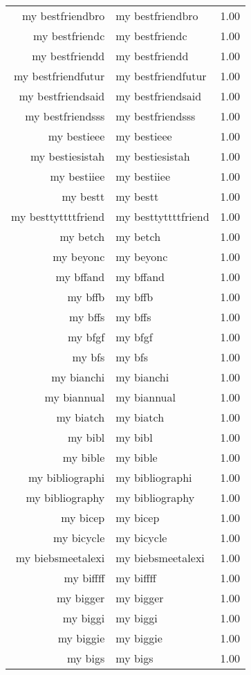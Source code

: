 \begin{table}[ht]
\begin{tabular}{rlr}
  my bestfriendbro & my bestfriendbro & 1.00 \\ 
  my bestfriendc & my bestfriendc & 1.00 \\ 
  my bestfriendd & my bestfriendd & 1.00 \\ 
  my bestfriendfutur & my bestfriendfutur & 1.00 \\ 
  my bestfriendsaid & my bestfriendsaid & 1.00 \\ 
  my bestfriendsss & my bestfriendsss & 1.00 \\ 
  my bestieee & my bestieee & 1.00 \\ 
  my bestiesistah & my bestiesistah & 1.00 \\ 
  my bestiiee & my bestiiee & 1.00 \\ 
  my bestt & my bestt & 1.00 \\ 
  my besttyttttfriend & my besttyttttfriend & 1.00 \\ 
  my betch & my betch & 1.00 \\ 
  my beyonc & my beyonc & 1.00 \\ 
  my bffand & my bffand & 1.00 \\ 
  my bffb & my bffb & 1.00 \\ 
  my bffs & my bffs & 1.00 \\ 
  my bfgf & my bfgf & 1.00 \\ 
  my bfs & my bfs & 1.00 \\ 
  my bianchi & my bianchi & 1.00 \\ 
  my biannual & my biannual & 1.00 \\ 
  my biatch & my biatch & 1.00 \\ 
  my bibl & my bibl & 1.00 \\ 
  my bible & my bible & 1.00 \\ 
  my bibliographi & my bibliographi & 1.00 \\ 
  my bibliography & my bibliography & 1.00 \\ 
  my bicep & my bicep & 1.00 \\ 
  my bicycle & my bicycle & 1.00 \\ 
  my biebsmeetalexi & my biebsmeetalexi & 1.00 \\ 
  my biffff & my biffff & 1.00 \\ 
  my bigger & my bigger & 1.00 \\ 
  my biggi & my biggi & 1.00 \\ 
  my biggie & my biggie & 1.00 \\ 
  my bigs & my bigs & 1.00 \\ 

\end{tabular}
\end{table}
